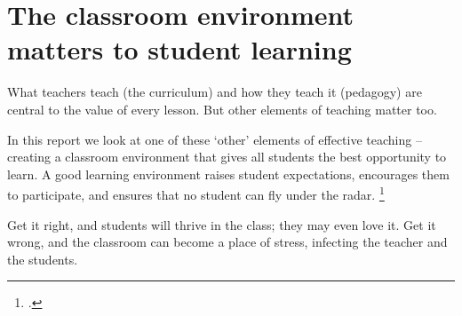 \documentclass{grattan}
\begin{document}
\contentspage

\chapter{The classroom environment matters to student learning}\label{chap:classroom-environment-matters}

What teachers teach (the curriculum) and how they teach it (pedagogy) are central to the value of every lesson. But other elements of teaching matter too.

In this report we look at one of these `other' elements of effective teaching -- creating a classroom environment that gives all students the best opportunity to learn. A good learning environment raises student expectations, encourages them to participate, and ensures that no student can fly under the radar.%
    \footcites{Evertson2006ClassroomManagementField}{Jones2004ComprehensiveClassroomManagement}{Marzano2003ClassroomManagementWorks}{McDonald2013ClassroomManagementEngaging}{Porter2007StudentBehaviourTheory}

Get it right, and students will thrive in the class; they may even love it. Get it wrong, and the classroom can become a place of stress, infecting the teacher and the students.
\end{document}

